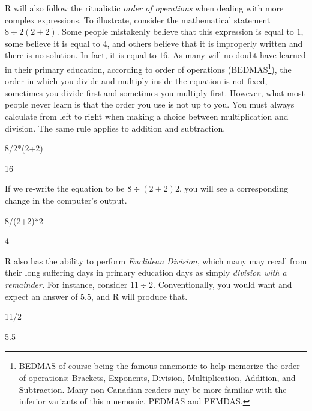 R will also follow the ritualistic \textit{order of operations} when dealing with more complex expressions.  To illustrate, consider the mathematical statement $8\div2(2+2)$. Some people mistakenly believe that this expression is equal to $1$, some believe it is equal to $4$, and others believe that it is improperly written and there is no solution. In fact, it is equal to $16$. As many will no doubt have learned in their primary education, according to order of operations (BEDMAS\footnote{BEDMAS of course being the famous mnemonic to help memorize the order of operations: Brackets, Exponents, Division, Multiplication, Addition, and Subtraction. Many non-Canadian readers may be more familiar with the inferior variants of this mnemonic, PEDMAS and PEMDAS.}), the order in which you divide and multiply inside the equation is not fixed, sometimes you divide first and sometimes you multiply first. However, what most people never learn is that the order you use is not up to you. You must always calculate from left to right when making a choice between multiplication and division.  The same rule applies to addition and subtraction.

\begin{inR}
8/2*(2+2)
\end{inR}

\begin{outR}
[1] 16
\end{outR}

\noindent
If we re-write the equation to be $8\div(2+2)2$, you will see a corresponding change in the computer's output.

\begin{inR}
8/(2+2)*2
\end{inR}

\begin{outR}
[1] 4
\end{outR}

R also has the ability to perform \textit{Euclidean Division}, which many may recall from their long suffering days in primary education days as simply \textit{division with a remainder.}  For instance, consider $11 \div 2$.  Conventionally, you would want and expect an answer of $5.5$, and R will produce that.

\begin{inR}
11/2
\end{inR}

\begin{outR}
[1] 5.5
\end{outR}

